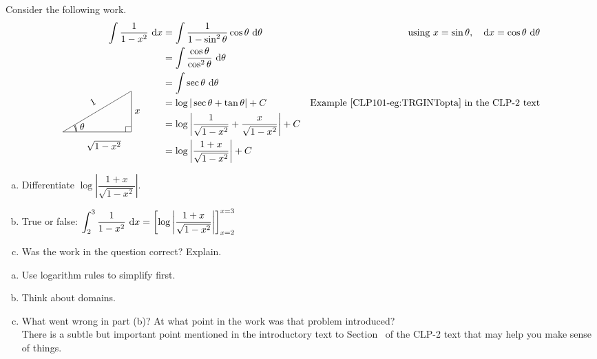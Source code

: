 \begin{Mquestion}
Consider the following work.
\color{blue}
\begin{align*}
\int \frac{1}{1-x^2}~\dee{x}&=\int\dfrac{1}{1-\sin^2 \theta}\cos\theta~\dee{\theta}&\mbox{using } x=\sin\theta,\quad \dee{x}=\cos\theta~\dee{\theta}\\
&=\int \frac{\cos \theta}{\cos^2 \theta}~\dee\theta\\
&=\int \sec \theta~\dee{\theta}\\
&=\log|\sec \theta + \tan \theta| +C & \mbox{Example~\eref{CLP101}{eg:TRGINTopta} in the CLP-2 text}\\
&=\log\left | 
\dfrac{1}{\sqrt{1-x^2}}+\dfrac{x}{\sqrt{1-x^2}}
\right| +C\\
\smash{\trigtri{\theta}{\sqrt{1-x^2}}{x}{1}}\qquad&=\log\left | 
\dfrac{1+x}{\sqrt{1-x^2}}
\right| +C
\end{align*}
\color{black}
\begin{enumerate}[(a)]
\item Differentiate $\log\left|  \dfrac{1+x}{\sqrt{1-x^2}}\right|$.
\item True or false: $\displaystyle\int_{2}^{3} \frac{1}{1-x^2}~\mathrm{d}x =
\left[\log\left|  \dfrac{1+x}{\sqrt{1-x^2}}\right|\right]_{x=2}^{x=3}$
\item Was the work in the question correct? Explain.
\end{enumerate}
\end{Mquestion}
\begin{hint}
\begin{enumerate}[(a)]
\item Use logarithm rules to simplify first.
\item Think about domains.
\item What went wrong in part (b)? At what point in the work was that problem introduced?\\
There is a subtle but important point mentioned in the introductory text to Section~ of the CLP-2 text that may help you make sense of things.
\end{enumerate}
\end{hint}
